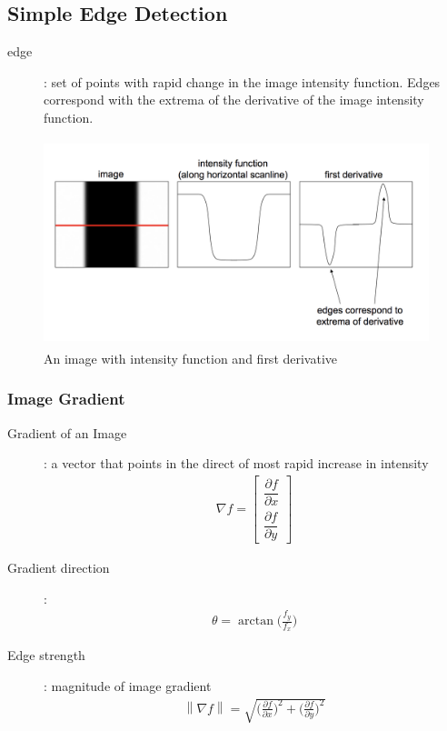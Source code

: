 \documentclass[letterpaper,12pt]{article}
\newcommand{\norm}[1]{\left\lVert#1\right\rVert}
\begin{document}
\subsection{Simple Edge Detection}
\begin{description}
 \item[edge]: set of points with rapid change in the image intensity function. Edges correspond with the extrema of the derivative of the image intensity function.
\end{description}
\begin{figure}[H]
 \centering
 \includegraphics[height=6cm]{images/edge_intensity_extrema.png}
 \caption{An image with intensity function and first derivative}
\end{figure}

\subsubsection{Image Gradient}
\begin{description}
 \item[Gradient of an Image]: a vector that points in the direct of most rapid increase in intensity
       \begin{align}
        \nabla f =
        \begin{bmatrix}
         \dfrac{\partial f}{\partial x} \\[3ex]
         \dfrac{\partial f}{\partial y}
        \end{bmatrix}
       \end{align}
 \item[Gradient direction]:
       \begin{align}
        \theta = \arctan\bigg(\frac{f_y}{f_x}\bigg)
       \end{align}
 \item[Edge strength]: magnitude of image gradient
       \begin{align}
        \norm{\nabla f} = \sqrt{\bigg(\frac{\partial f}{\partial x}\bigg)^2 + \bigg(\frac{\partial f}{\partial y}\bigg)^2}
       \end{align}
\end{description}
\end{document}
